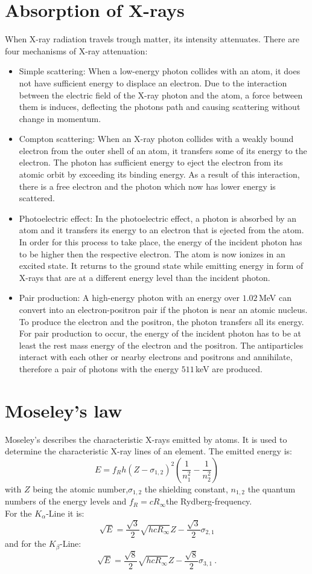 \section{Absorption of X-rays}
When X-ray radiation travels trough matter, its intensity attenuates. There are four mechanisms of X-ray attenuation:
\begin{itemize}
    \item Simple scattering: When a low-energy photon collides with an atom, it does not have sufficient energy to displace an electron. Due to the interaction between the electric field of the X-ray photon and the atom, a force between them is induces, deflecting the photons path and causing scattering without change in momentum.
    \item Compton scattering: When an X-ray photon collides with a weakly bound electron from the outer shell of an atom, it transfers some of its energy to the electron. The photon has sufficient energy to eject the electron from its atomic orbit by exceeding its binding energy. As a result of this interaction, there is a free electron and the photon which now has lower energy is scattered.
    \item Photoelectric effect: In the photoelectric effect, a photon is absorbed by an atom and it transfers its energy to an electron that is ejected from the atom. In order for this process to take place, the energy of the incident photon has to be higher then the respective electron. The atom is now ionizes in an excited state. It returns to the ground state while emitting energy in form of X-rays that are at a different energy level than the incident photon.
    \item Pair production: A high-energy photon with an energy over $1.02\,$MeV can convert into an electron-positron pair if the photon is near an atomic nucleus. To produce the electron and the positron, the photon transfers all its energy. For pair production to occur, the energy of the incident photon has to be at least the rest mass energy of the electron and the positron. The antiparticles interact with each other or nearby electrons and positrons and annihilate, therefore a pair of photons with the energy $511\,$keV are produced. 
\end{itemize}


\section{Moseley's law}
\label{chapter:moseley}
Moseley's describes the characteristic X-rays emitted by atoms. It is used to determine the characteristic X-ray lines of an element.
The emitted energy is:
$$E=f_{R}h(Z-\sigma_{1,2})^{2}\left(\frac{1}{n_{1}^{2}}-\frac{1}{n_{2}^{2}}\right)$$
with $Z$ being the atomic number,$\sigma_{1,2}$ the shielding constant, $n_{1,2}$ the quantum numbers of the energy levels and $f_{R}=cR_{\infty}$the Rydberg-frequency.\\
For the $K_{\alpha}$-Line it is:
$$\sqrt{E}=\frac{\sqrt{3}}{2}\sqrt{hcR_{\infty}}Z-\frac{\sqrt{3}}{2}\sigma_{2,1}$$
and for the $K_{\beta}$-Line:
$$\sqrt{E}=\frac{\sqrt{8}}{2}\sqrt{hcR_{\infty}}Z-\frac{\sqrt{8}}{2}\sigma_{3,1}~.$$